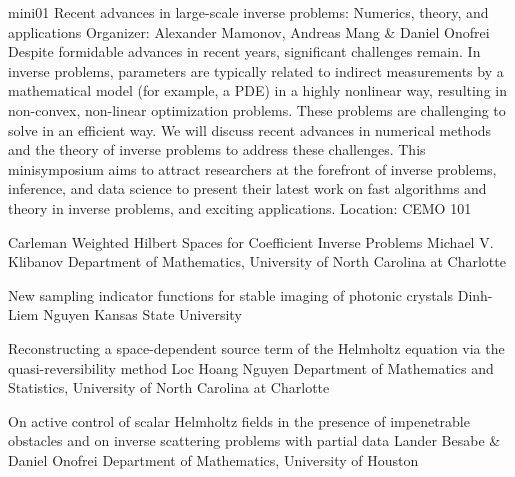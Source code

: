 \mini
{mini01}
{Recent advances in large-scale inverse problems: Numerics, theory, and applications}
{Organizer: Alexander Mamonov, Andreas Mang \& Daniel Onofrei}
{Despite formidable advances in recent years, significant challenges remain. In inverse problems, parameters are typically related to indirect measurements by a mathematical model (for example, a PDE) in a highly nonlinear way, resulting in non-convex, non-linear optimization problems. These problems are challenging to solve in an efficient way. We will discuss recent advances in numerical methods and the theory of inverse problems to address these challenges. This minisymposium aims to attract researchers at the forefront of inverse problems, inference, and data science to present their latest work on fast algorithms and theory in inverse problems, and exciting applications.}
{Location: CEMO 101}

\begin{talks}
\item\talk
{Carleman Weighted Hilbert Spaces for Coefficient Inverse Problems}
{Michael V. Klibanov}
{Department of Mathematics, University of North Carolina at Charlotte}
\item\talk
{New sampling indicator functions for stable imaging of photonic crystals}
{Dinh-Liem Nguyen}
{Kansas State University}
\item\talk
{Reconstructing a space-dependent source term of the Helmholtz equation via the quasi-reversibility method}
{Loc Hoang Nguyen}
{Department of Mathematics and Statistics, University of North Carolina at Charlotte}
\item\talk
{On active control of scalar Helmholtz fields in the presence of impenetrable obstacles and on inverse scattering problems with partial data}
{Lander Besabe \& Daniel Onofrei}
{Department of Mathematics, University of Houston}
\end{talks}
\room

